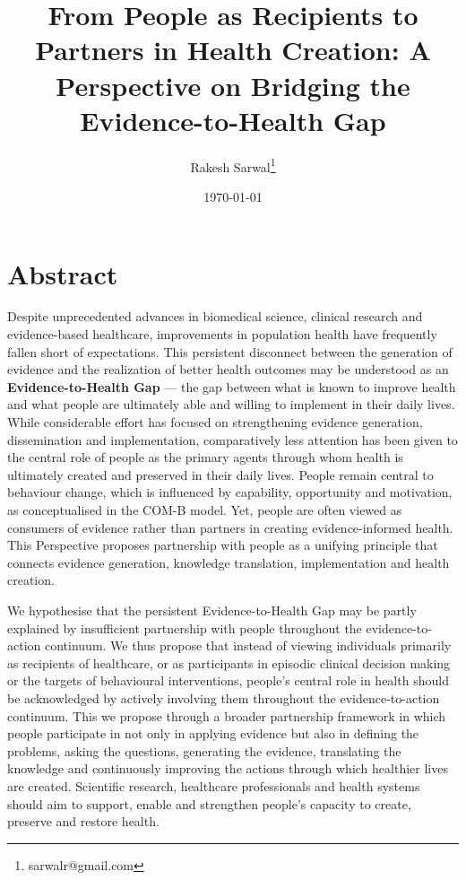 \documentclass{article}
\author{Rakesh Sarwal\thanks{sarwalr@gmail.com}}
\date{\today}
\title{From People as Recipients to Partners in Health Creation: A Perspective on Bridging the Evidence-to-Health Gap}
\begin{document}
\maketitle
\section{Abstract}
\label{sec:org1b199b3}
Despite unprecedented advances in biomedical science, clinical research and evidence-based healthcare, improvements in population health have frequently fallen short of expectations. This persistent disconnect between the generation of evidence and the realization of better health outcomes may be understood as an \textbf{\textbf{Evidence-to-Health Gap}} — the gap between what is known to improve health and what people are ultimately able and willing to implement in their daily lives. While considerable effort has focused on strengthening evidence generation, dissemination and implementation, comparatively less attention has been given to the central role of people as the primary agents through whom health is ultimately created and preserved in their daily lives. People remain central to behaviour change, which is influenced by capability, opportunity and motivation, as conceptualised in the COM-B model. Yet, people are often viewed as consumers of evidence rather than partners in creating evidence-informed health. This Perspective proposes partnership with people as a unifying principle that connects evidence generation, knowledge translation, implementation and health creation. 

We hypothesise that the persistent Evidence-to-Health Gap may be partly explained by insufficient partnership with people throughout the evidence-to-action continuum. We thus propose that instead of viewing individuals primarily as recipients of healthcare, or as participants in episodic clinical decision making or the targets of behavioural interventions, people's central role in health should be acknowledged by actively involving them throughout the evidence-to-action continuum. This we propose through a broader partnership framework in which people participate in not only in applying evidence but also in defining the problems, asking the questions, generating the evidence, translating the knowledge and continuously improving the actions through which healthier lives are created. Scientific research, healthcare professionals and health systems should aim to support, enable and strengthen people's capacity to create, preserve and restore health.
\end{document}
